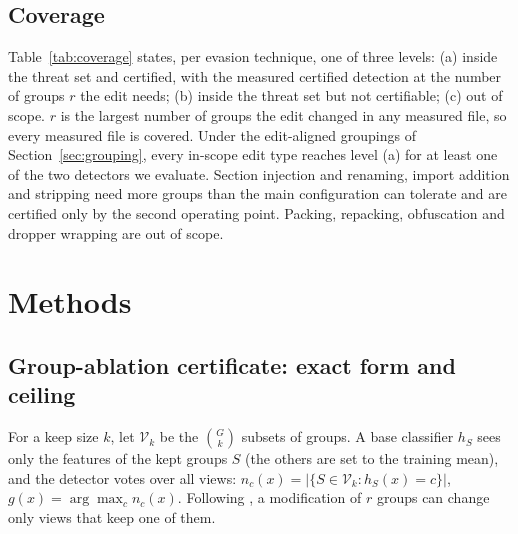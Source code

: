 \documentclass[preprint,12pt,authoryear]{elsarticle}
\begin{document}
\subsection{Coverage}\label{sec:coverage}
Table~\ref{tab:coverage} states, per evasion technique, one of three levels: (a) inside the threat set and certified, with the measured certified detection at the number of groups $r$ the edit needs; (b) inside the threat set but not certifiable; (c) out of scope. $r$ is the largest number of groups the edit changed in any measured file, so every measured file is covered. Under the edit-aligned groupings of Section~\ref{sec:grouping}, every in-scope edit type reaches level (a) for at least one of the two detectors we evaluate. Section injection and renaming, import addition and stripping need more groups than the main configuration can tolerate and are certified only by the second operating point. Packing, repacking, obfuscation and dropper wrapping are out of scope.

\begin{table}[!htbp]
\centering\small
\caption{Coverage of evasion techniques. Level (a): inside the threat set and certified; (b): inside but not certifiable; (c): out of scope. For each detector, the number of edit-aligned groups $r$ the technique needs (largest over the measured files) and the certified detection of per-view LightGBM at that $r$ (family split, \NSeedsFam{} seeds). Main: aligned5, $k=2$; second: aligned7, $k=1$.}\label{tab:coverage}
\resizebox{\textwidth}{!}{}
\end{table}

\FloatBarrier
\section{Methods}\label{sec:methods}
\subsection{Group-ablation certificate: exact form and ceiling}\label{sec:cert}
For a keep size $k$, let $\mathcal{V}_k$ be the $\binom{G}{k}$ subsets of groups. A base classifier $h_S$ sees only the features of the kept groups $S$ (the others are set to the training mean), and the detector votes over all views: $n_c(x)=|\{S\in\mathcal{V}_k:h_S(x)=c\}|$, $g(x)=\arg\max_c n_c(x)$. Following \citet{levine2020patch}, a modification of $r$ groups can change only views that keep one of them.
\end{document}
